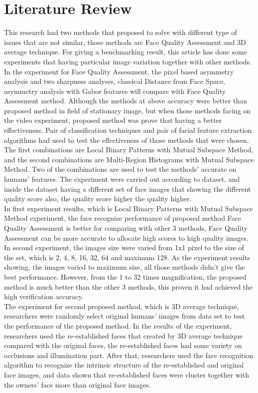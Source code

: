 \documentclass[12pt]{article}
\begin{document}
\section{Literature Review}
This research had two methods that proposed to solve with different type of issues that are not similar, those methods are Face Quality Assessment and 3D average technique. For giving a benchmarking result, this article has done some experiments that having particular image variation together with other methods.  In the experiment for Face Quality Assessment, the pixel based asymmetry analysis and two sharpness analyses, classical Distance from Face Space, asymmetry analysis with Gabor features will compare with Face Quality Assessment method. Although the methods at above accuracy were better than proposed method in field of stationary image, but when those methods facing on the video experiment, proposed method was prove that having a better effectiveness. Pair of classification techniques and pair of facial feature extraction algorithms had used to test the effectiveness of those methods that were chosen. The first combinations are Local Binary Patterns with Mutual Subspace Method, and the second combinations are Multi-Region Histograms with Mutual Subspace Method. Two of the combinations are used to test the methods’ accurate on humans’ features.  The experiment were carried out according to dataset, and inside the dataset having a different set of face images that showing the different quality score also, the quality score higher the quality higher.\vspace{3mm}\\ 
In first experiment results, which is Local Binary Patterns with Mutual Subspace Method experiment, the face recognize performance of proposed method Face Quality Assessment is better for comparing with other 3 methods, Face Quality Assessment can be more accurate to allocate high scores to high quality images.\vspace{3mm}\\ 
In second experiment, the images size were varied from 1x1 pixel to the size of the set, which is 2, 4, 8, 16, 32, 64 and maximum 128. As the experiment results showing, the images varied to maximum size, all those methods didn’t give the best performance. However, from the 1 to 32 times magnification, the proposed method is much better than the other 3 methods, this proven it had achieved the high verification accuracy.\vspace{3mm}\\ 
The experiment for second proposed method, which is 3D average technique, researchers were randomly select original humans’ images from data set to test the performance of the proposed method. In the results of the experiment, researchers used the re-established faces that created by 3D average technique compared with the original faces, the re-established faces had some variety on occlusions and illumination part. After that, researchers used the face recognition algorithm to recognize the intrinsic structure of the re-established and original face images, and data shown that re-established faces were cluster together with the owners’ face more than original face images.
\end{document}
